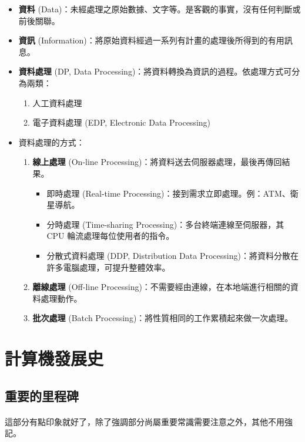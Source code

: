 \documentclass[12pt,a4paper,oneside]{report}
\begin{document}
\begin{CJK}{UTF8}{bkai}
\begin{itemize}
\item \textbf{資料} (Data)：未經處理之原始數據、文字等。是客觀的事實，沒有任何判斷或前後關聯。
\item \textbf{資訊} (Information)：將原始資料經過一系列有計畫的處理後所得到的有用訊息。
\item \textbf{資料處理} (DP, Data Processing)：將資料轉換為資訊的過程。依處理方式可分為兩類：
  \begin{enumerate}
  \item 人工資料處理
  \item 電子資料處理 (EDP, Electronic Data Processing)
  \end{enumerate}
\item 資料處理的方式：
  \begin{enumerate}
  \item \textbf{線上處理} (On-line Processing)：將資料送去伺服器處理，最後再傳回結果。
    \begin{itemize}
    \item 即時處理 (Real-time Processing)：接到需求立即處理。例：ATM、衛星導航。
    \item 分時處理 (Time-sharing Processing)：多台終端連線至伺服器，其 CPU 輪流處理每位使用者的指令。
    \item 分散式資料處理 (DDP, Distribution Data Processing)：將資料分散在許多電腦處理，可提升整體效率。
    \end{itemize}
  \item \textbf{離線處理} (Off-line Processing)：不需要經由連線，在本地端進行相關的資料處理動作。
  \item \textbf{批次處理} (Batch Processing)：將性質相同的工作累積起來做一次處理。
  \end{enumerate}
\end{itemize}

\section{計算機發展史}

\subsection{重要的里程碑}

\paragraph{}這部分有點印象就好了，除了強調部分尚屬重要常識需要注意之外，其他不用強記。


\end{CJK}
\end{document}
